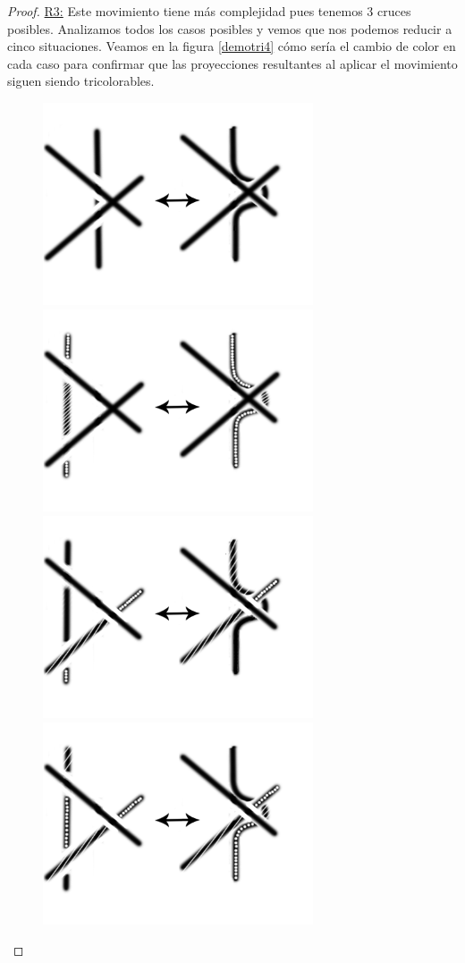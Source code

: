 \begin{teo}
\begin{proof}
		\underline{R3:}
		Este movimiento tiene más complejidad pues tenemos 3 cruces posibles. Analizamos todos los casos posibles y vemos que nos podemos reducir a cinco situaciones. Veamos en la figura \ref{demotri4} cómo sería el cambio de color en cada caso para confirmar que las proyecciones resultantes al aplicar el movimiento siguen siendo tricolorables.
		\begin{figure}[h!]
			\centering
			\includegraphics[width=8cm]{inudos/movi5.png}
			\includegraphics[width=8cm]{inudos/movi5tri1.png}
			\includegraphics[width=8cm]{inudos/movi5tri2.png}
			\includegraphics[width=8cm]{inudos/movi5tri3.png}

\end{figure}
\end{proof}
\end{teo}
